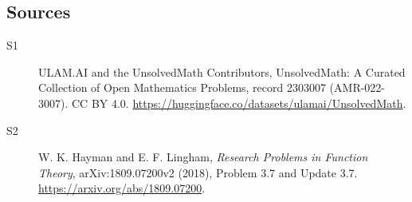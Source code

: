 \documentclass[11pt]{article}
\begin{document}
\subsection{Sources}
\begin{description}
\item[\hypertarget{source:2303007:1}{S1}] ULAM.AI and the UnsolvedMath Contributors, UnsolvedMath: A Curated Collection of Open Mathematics Problems, record 2303007 (AMR-022-3007). CC BY 4.0. \url{https://huggingface.co/datasets/ulamai/UnsolvedMath}.
\item[\hypertarget{source:2303007:2}{S2}] W. K. Hayman and E. F. Lingham, \emph{Research Problems in Function Theory}, arXiv:1809.07200v2 (2018), Problem 3.7 and Update 3.7. \url{https://arxiv.org/abs/1809.07200}.
\end{description}
\label{end:2303007}
\end{document}
